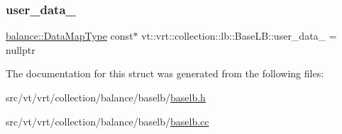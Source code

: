 \mbox{\label{structvt_1_1vrt_1_1collection_1_1lb_1_1_base_l_b_af9852e3a0504ffd474a7ebad1ee1a052}} 
\subsubsection{\texorpdfstring{user\+\_\+data\+\_\+}{user\_data\_}}
{\footnotesize\ttfamily \hyperlink{namespacevt_1_1vrt_1_1collection_1_1balance_a5794b6bc763c88c78228074bd0d1a50f}{balance\+::\+Data\+Map\+Type} const$\ast$ vt\+::vrt\+::collection\+::lb\+::\+Base\+L\+B\+::user\+\_\+data\+\_\+ = nullptr\hspace{0.3cm}{\ttfamily [protected]}}



The documentation for this struct was generated from the following files\+:\begin{DoxyCompactItemize}
\item 
src/vt/vrt/collection/balance/baselb/\hyperlink{baselb_8h}{baselb.\+h}\item 
src/vt/vrt/collection/balance/baselb/\hyperlink{baselb_8cc}{baselb.\+cc}\end{DoxyCompactItemize}
